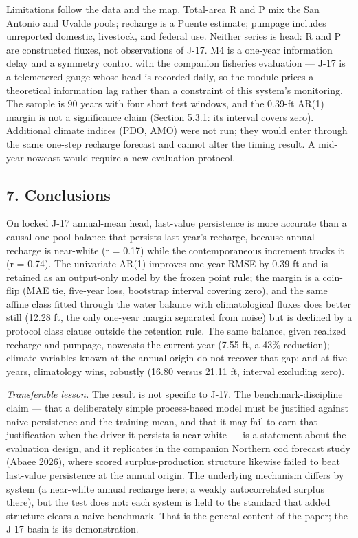 \documentclass[11pt]{article}
\begin{document}
Limitations follow the data and the map. Total-area R and P mix the San
Antonio and Uvalde pools; recharge is a Puente estimate; pumpage
includes unreported domestic, livestock, and federal use. Neither series
is head: R and P are constructed fluxes, not observations of J-17. M4 is
a one-year information delay and a symmetry control with the companion
fisheries evaluation --- J-17 is a telemetered gauge whose head is
recorded daily, so the module prices a theoretical information lag
rather than a constraint of this system's monitoring. The sample is 90
years with four short test windows, and the 0.39-ft AR(1) margin is not
a significance claim (Section 5.3.1: its interval covers zero).
Additional climate indices (PDO, AMO) were not run; they would enter
through the same one-step recharge forecast and cannot alter the timing
result. A mid-year nowcast would require a new evaluation protocol.

\subsection{7. Conclusions}\label{conclusions}

On locked J-17 annual-mean head, last-value persistence is more accurate
than a causal one-pool balance that persists last year's recharge,
because annual recharge is near-white (r = 0.17) while the
contemporaneous increment tracks it (r = 0.74). The univariate AR(1)
improves one-year RMSE by 0.39 ft and is retained as an output-only
model by the frozen point rule; the margin is a coin-flip (MAE tie,
five-year loss, bootstrap interval covering zero), and the same affine
class fitted through the water balance with climatological fluxes does
better still (12.28 ft, the only one-year margin separated from noise)
but is declined by a protocol class clause outside the retention rule.
The same balance, given realized recharge and pumpage, nowcasts the
current year (7.55 ft, a 43\% reduction); climate variables known at the
annual origin do not recover that gap; and at five years, climatology
wins, robustly (16.80 versus 21.11 ft, interval excluding zero).

\emph{Transferable lesson.} The result is not specific to J-17. The
benchmark-discipline claim --- that a deliberately simple process-based
model must be justified against naive persistence and the training mean,
and that it may fail to earn that justification when the driver it
persists is near-white --- is a statement about the evaluation design, and
it replicates in the companion Northern cod forecast study (Abaee 2026),
where scored surplus-production structure likewise failed to beat
last-value persistence at the annual origin. The underlying mechanism
differs by system (a near-white annual recharge here; a weakly
autocorrelated surplus there), but the test does not: each system is
held to the standard that added structure clears a naive benchmark. That
is the general content of the paper; the J-17 basin is its
demonstration.
\end{document}
